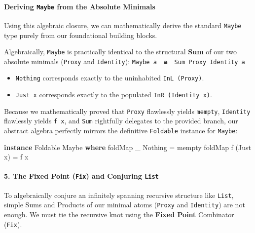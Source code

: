 \documentclass[
]{article}
\newenvironment{Shaded}{}{}
\newcommand{\DataTypeTok}[1]{\textcolor[rgb]{0.56,0.13,0.00}{#1}}
\newcommand{\FunctionTok}[1]{\textcolor[rgb]{0.02,0.16,0.49}{#1}}
\newcommand{\KeywordTok}[1]{\textcolor[rgb]{0.00,0.44,0.13}{\textbf{#1}}}
\newcommand{\NormalTok}[1]{#1}
\newcommand{\OtherTok}[1]{\textcolor[rgb]{0.00,0.44,0.13}{#1}}
\providecommand{\tightlist}{%
  \setlength{\itemsep}{0pt}\setlength{\parskip}{0pt}}
\begin{document}
\paragraph{\texorpdfstring{Deriving \texttt{Maybe} from the Absolute
Minimals}{Deriving Maybe from the Absolute Minimals}}\label{deriving-maybe-from-the-absolute-minimals}

Using this algebraic closure, we can mathematically derive the standard
\texttt{Maybe} type purely from our foundational building blocks.

Algebraically, \texttt{Maybe} is practically identical to the structural
\textbf{Sum} of our two absolute minimals (\texttt{Proxy} and
\texttt{Identity}): \texttt{Maybe\ a\ \ ≅\ \ Sum\ Proxy\ Identity\ a}

\begin{itemize}
\tightlist
\item
  \texttt{Nothing} corresponds exactly to the uninhabited
  \texttt{InL\ (Proxy)}.
\item
  \texttt{Just\ x} corresponds exactly to the populated
  \texttt{InR\ (Identity\ x)}.
\end{itemize}

Because we mathematically proved that \texttt{Proxy} flawlessly yields
\texttt{mempty}, \texttt{Identity} flawlessly yields \texttt{f\ x}, and
\texttt{Sum} rightfully delegates to the provided branch, our abstract
algebra perfectly mirrors the definitive \texttt{Foldable} instance for
\texttt{Maybe}:

\begin{Shaded}
\begin{Highlighting}[]
\KeywordTok{instance} \DataTypeTok{Foldable} \DataTypeTok{Maybe} \KeywordTok{where}
    \FunctionTok{foldMap}\NormalTok{ \_ }\DataTypeTok{Nothing}  \OtherTok{=} \FunctionTok{mempty}
    \FunctionTok{foldMap}\NormalTok{ f (}\DataTypeTok{Just}\NormalTok{ x) }\OtherTok{=}\NormalTok{ f x}
\end{Highlighting}
\end{Shaded}

\paragraph{\texorpdfstring{5. The Fixed Point (\texttt{Fix}) and
Conjuring
\texttt{List}}{5. The Fixed Point (Fix) and Conjuring List}}\label{the-fixed-point-fix-and-conjuring-list}

To algebraically conjure an infinitely spanning recursive structure like
\texttt{List}, simple Sums and Products of our minimal atoms
(\texttt{Proxy} and \texttt{Identity}) are not enough. We must tie the
recursive knot using the \textbf{Fixed Point} Combinator (\texttt{Fix}).
\end{document}

